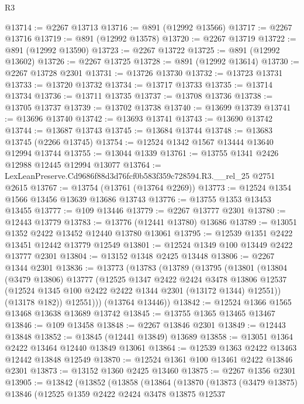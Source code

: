 \begin{lexlean}{R3}
\begin{coremodule}
@13714 := @2267 @13713
@13716 := @891 (@12992 @13566)
@13717 := @2267 @13716
@13719 := @891 (@12992 @13578)
@13720 := @2267 @13719
@13722 := @891 (@12992 @13590)
@13723 := @2267 @13722
@13725 := @891 (@12992 @13602)
@13726 := @2267 @13725
@13728 := @891 (@12992 @13614)
@13730 := @2267 @13728 @2301
@13731 := @13726 @13730
@13732 := @13723 @13731
@13733 := @13720 @13732
@13734 := @13717 @13733
@13735 := @13714 @13734
@13736 := @13711 @13735
@13737 := @13708 @13736
@13738 := @13705 @13737
@13739 := @13702 @13738
@13740 := @13699 @13739
@13741 := @13696 @13740
@13742 := @13693 @13741
@13743 := @13690 @13742
@13744 := @13687 @13743
@13745 := @13684 @13744
@13748 := @13683 @13745 (@2266 @13745)
@13754 := @12524 @1342 @1567 @13444 @13640 @12994 @13744
@13755 := @13044 @1339
@13761 := @13755 @1341 @2426 @12988 @12445 @12994 @13077
@13764 := LexLeanPreserve.Cd9686f88d3d76fcf0b583f359c728594.R3.__rel_25 @2751 @2615
@13767 := @13754 (@13761 (@13764 @2269))
@13773 := @12524 @1354 @1566 @13456 @13639 @13686 @13743
@13776 := @13755 @1353 @13453 @13455
@13777 := @109 @13446
@13779 := @2267 @13777 @2301
@13780 := @12443 @13779
@13783 := @13776 (@12441 @13780) @13686
@13789 := @13051 @1352 @2422 @13452 @12440 @13780 @13061
@13795 := @12539 @1351 @2422 @13451 @12442 @13779 @12549
@13801 := @12524 @1349 @100 @13449 @2422 @13777 @2301
@13804 := @13152 @1348 @2425 @13448
@13806 := @2267 @1344 @2301
@13836 := @13773
    (@13783
      (@13789
        (@13795
          (@13801
            (@13804
              (@3479 @13806)
              @13777
              (@12525
                @1347
                @2422
                @2424
                @3478
                @13806
                @12537
                (@12524 @1345 @100 @2422 @2422 @1344 @2301 (@13172 @1344) @12551))
              (@13178 @182))
            @12551)))
      (@13764 @13446))
@13842 := @12524 @1366 @1565 @13468 @13638 @13689 @13742
@13845 := @13755 @1365 @13465 @13467
@13846 := @109 @13458
@13848 := @2267 @13846 @2301
@13849 := @12443 @13848
@13852 := @13845 (@12441 @13849) @13689
@13858 := @13051 @1364 @2422 @13464 @12440 @13849 @13061
@13864 := @12539 @1363 @2422 @13463 @12442 @13848 @12549
@13870 := @12524 @1361 @100 @13461 @2422 @13846 @2301
@13873 := @13152 @1360 @2425 @13460
@13875 := @2267 @1356 @2301
@13905 := @13842
    (@13852
      (@13858
        (@13864
          (@13870
            (@13873
              (@3479 @13875)
              @13846
              (@12525
                @1359
                @2422
                @2424
                @3478
                @13875
                @12537

\end{coremodule}
\end{lexlean}
